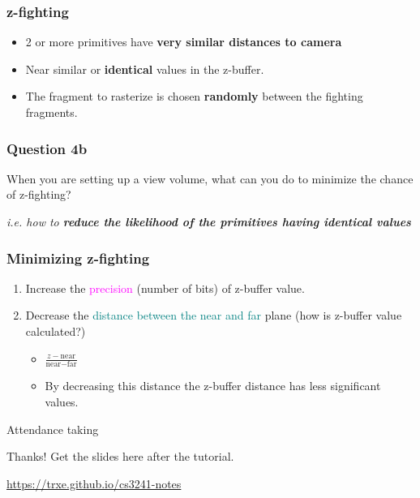 \documentclass{beamer}
\begin{document}
\begin{frame}
    \frametitle{z-fighting}

    \begin{itemize}
        \item 2 or more primitives have \textbf{very similar distances to camera}
        \item Near similar or \textbf{identical} values in the z-buffer.
        \item The fragment to rasterize is chosen \textbf{randomly} between the fighting fragments.
    \end{itemize}

\end{frame}

\begin{frame}
    \frametitle{Question 4b}

    When you are setting up a view volume, what can you do to minimize the chance of z-fighting? 

    \vspace{1em}
    \textit{i.e. how to \textbf{reduce the likelihood of the primitives having identical values}}

\end{frame}

\begin{frame}
    \frametitle{Minimizing z-fighting}

    \begin{enumerate}
        \item Increase the \textcolor{magenta}{precision} (number of bits) of z-buffer value.
        \item Decrease the \textcolor{teal}{distance between the near and far} plane (how is z-buffer value calculated?)
        \begin{itemize}
            \item $\frac{z - \text{near}}{\text{near} - \text{far}}$
            \item By decreasing this distance the z-buffer distance has less significant values.
        \end{itemize}
    \end{enumerate}

\end{frame}

\begin{frame}
    \AlegreyaExtraBold \LARGE
    Attendance taking
\end{frame}

\ThankYou
\begin{frame}
    Thanks! Get the slides here after the tutorial.\\
    \vspace{2em}
    \scalebox{3}{\faGithub}\par\bigskip
    \url{https://trxe.github.io/cs3241-notes}
\end{frame}
\end{document}
